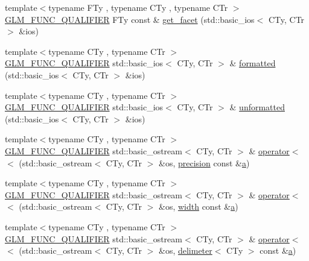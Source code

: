 \begin{DoxyCompactItemize}
\item 
{\footnotesize template$<$typename F\+Ty , typename C\+Ty , typename C\+Tr $>$ }\\\mbox{\hyperlink{setup_8hpp_a33fdea6f91c5f834105f7415e2a64407}{G\+L\+M\+\_\+\+F\+U\+N\+C\+\_\+\+Q\+U\+A\+L\+I\+F\+I\+ER}} F\+Ty const  \& \mbox{\hyperlink{namespaceglm_1_1io_a9e8927cf032254b0eee4ec650286e1f9}{get\+\_\+facet}} (std\+::basic\+\_\+ios$<$ C\+Ty, C\+Tr $>$ \&ios)
\item 
{\footnotesize template$<$typename C\+Ty , typename C\+Tr $>$ }\\\mbox{\hyperlink{setup_8hpp_a33fdea6f91c5f834105f7415e2a64407}{G\+L\+M\+\_\+\+F\+U\+N\+C\+\_\+\+Q\+U\+A\+L\+I\+F\+I\+ER}} std\+::basic\+\_\+ios$<$ C\+Ty, C\+Tr $>$ \& \mbox{\hyperlink{namespaceglm_1_1io_aa31ec433f6039e5bd35f0f58b37bef83}{formatted}} (std\+::basic\+\_\+ios$<$ C\+Ty, C\+Tr $>$ \&ios)
\item 
{\footnotesize template$<$typename C\+Ty , typename C\+Tr $>$ }\\\mbox{\hyperlink{setup_8hpp_a33fdea6f91c5f834105f7415e2a64407}{G\+L\+M\+\_\+\+F\+U\+N\+C\+\_\+\+Q\+U\+A\+L\+I\+F\+I\+ER}} std\+::basic\+\_\+ios$<$ C\+Ty, C\+Tr $>$ \& \mbox{\hyperlink{namespaceglm_1_1io_a8f950faa7ad67cac1287beaf896a8bb6}{unformatted}} (std\+::basic\+\_\+ios$<$ C\+Ty, C\+Tr $>$ \&ios)
\item 
{\footnotesize template$<$typename C\+Ty , typename C\+Tr $>$ }\\\mbox{\hyperlink{setup_8hpp_a33fdea6f91c5f834105f7415e2a64407}{G\+L\+M\+\_\+\+F\+U\+N\+C\+\_\+\+Q\+U\+A\+L\+I\+F\+I\+ER}} std\+::basic\+\_\+ostream$<$ C\+Ty, C\+Tr $>$ \& \mbox{\hyperlink{namespaceglm_1_1io_ac52a8c5f8ea189f5bae2e5b8e382675f}{operator$<$$<$}} (std\+::basic\+\_\+ostream$<$ C\+Ty, C\+Tr $>$ \&os, \mbox{\hyperlink{structglm_1_1io_1_1precision}{precision}} const \&\mbox{\hyperlink{glad_8h_ac8729153468b5dcf13f971b21d84d4e5}{a}})
\item 
{\footnotesize template$<$typename C\+Ty , typename C\+Tr $>$ }\\\mbox{\hyperlink{setup_8hpp_a33fdea6f91c5f834105f7415e2a64407}{G\+L\+M\+\_\+\+F\+U\+N\+C\+\_\+\+Q\+U\+A\+L\+I\+F\+I\+ER}} std\+::basic\+\_\+ostream$<$ C\+Ty, C\+Tr $>$ \& \mbox{\hyperlink{namespaceglm_1_1io_ac4783e4e3b0384619625d5d2d00c27b8}{operator$<$$<$}} (std\+::basic\+\_\+ostream$<$ C\+Ty, C\+Tr $>$ \&os, \mbox{\hyperlink{structglm_1_1io_1_1width}{width}} const \&\mbox{\hyperlink{glad_8h_ac8729153468b5dcf13f971b21d84d4e5}{a}})
\item 
{\footnotesize template$<$typename C\+Ty , typename C\+Tr $>$ }\\\mbox{\hyperlink{setup_8hpp_a33fdea6f91c5f834105f7415e2a64407}{G\+L\+M\+\_\+\+F\+U\+N\+C\+\_\+\+Q\+U\+A\+L\+I\+F\+I\+ER}} std\+::basic\+\_\+ostream$<$ C\+Ty, C\+Tr $>$ \& \mbox{\hyperlink{namespaceglm_1_1io_a7c5774d5b7b03ff810042e141d893082}{operator$<$$<$}} (std\+::basic\+\_\+ostream$<$ C\+Ty, C\+Tr $>$ \&os, \mbox{\hyperlink{structglm_1_1io_1_1delimeter}{delimeter}}$<$ C\+Ty $>$ const \&\mbox{\hyperlink{glad_8h_ac8729153468b5dcf13f971b21d84d4e5}{a}})

\end{DoxyCompactItemize}

